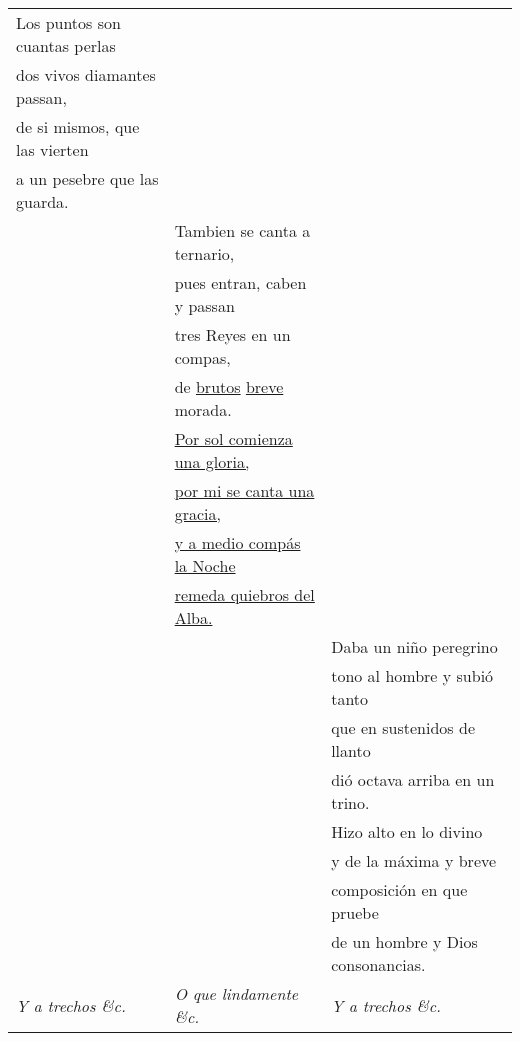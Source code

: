 \documentclass{aac-table}
\newcommand{\str}{\hspace{1em}}
\begin{document}
\begin{longtable}{lll}
    \str{} Los puntos son cuantas perlas &
    & \\

    dos vivos diamantes passan, &
    & \\

    de si mismos, que las vierten &
    & \\

    a un pesebre que las guarda. 
    & \\

    & 
    \str{} Tambien se canta a ternario, 
    & \\

    & 
    pues entran, caben y passan 
    & \\

    & 
    tres Reyes en un compas, 
    & \\
    
    &
    de \uline{brutos} \uline{breve} morada. 
    & \\


    & 
    \str{} \uline{Por sol comienza una gloria,}  &
    \\

    & 
    \uline{por mi se canta una gracia,} & 
    \\
    
    & \uline{y a medio compás la Noche} & 
    \\

    & \uline{remeda quiebros del Alba.} &
    \\

    & 
    &
    \str{} Daba un niño peregrino \\
    
    &
    &
    tono al hombre y subió tanto \\
    
    &
    &
    que en sustenidos de llanto \\
    
    &
    &
    dió octava arriba en un trino. \\
    
    &
    &
    \str{} Hizo alto en lo divino \\
    
    &
    &
    y de la máxima y breve \\
    
    &
    &
    composición en que pruebe \\
    
    &
    &
    de un hombre y Dios consonancias. \\

    \str{} \emph{Y a trechos \&c.}
    & \str{} \emph{O que lindamente \&c.}
    & \str{} \emph{Y a trechos \&c.} \\

\end{longtable}
\end{document}
